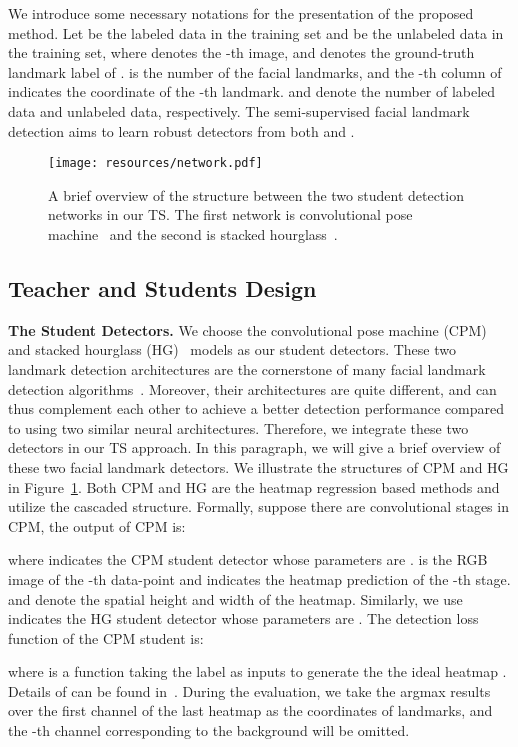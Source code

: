 \documentclass[10pt,twocolumn,letterpaper]{article}
\def\Figref#1{Figure~\ref{#1}}
\begin{document}
We introduce some necessary notations for the presentation of the proposed method.
Let  be the labeled data in the training set and  be the unlabeled data in the training set, where  denotes the -th image, and  denotes the ground-truth landmark label of .
 is the number of the facial landmarks, and the -th column of  indicates the coordinate of the -th landmark. 
 and  denote the number of labeled data and unlabeled data, respectively.
The semi-supervised facial landmark detection aims to learn robust detectors from both  and .




\begin{figure}[t]
\center
\texttt{[image: resources/network.pdf]}
\caption{
A brief overview of the structure between the two student detection networks in our TS. The first network is convolutional pose machine~\cite{wei2016convolutional} and the second is stacked hourglass~\cite{newell2016stacked}.
}
\label{fig:network}
\end{figure}



\subsection{Teacher and Students Design}\label{sec:teacher-student}

\textbf{The Student Detectors.}
We choose the convolutional pose machine (CPM)~\cite{wei2016convolutional} and stacked hourglass (HG)~\cite{newell2016stacked} models as our student detectors.
These two landmark detection architectures are the cornerstone of many facial landmark detection algorithms~\cite{newell2016stacked,dong2018san,bulat2017far,tang2018quantized}.
Moreover, their architectures are quite different, and can thus complement each other to achieve a better detection performance compared to using two similar neural architectures.
Therefore, we integrate these two detectors in our TS approach.
In this paragraph, we will give a brief overview of these two facial landmark detectors.
We illustrate the structures of CPM and HG in \Figref{fig:network}. Both CPM and HG are the heatmap regression based methods and utilize the cascaded structure.
Formally, suppose there are  convolutional stages in CPM, the output of CPM is:
{

}
\noindent where  indicates the CPM student detector whose parameters are .  is the RGB image of the -th data-point and  indicates the heatmap prediction of the -th stage.  and  denote the spatial height and width of the heatmap.
Similarly, we use  indicates the HG student detector whose parameters are .
The detection loss function of the CPM student is:
{

}\noindent where  is a function taking the label  as inputs to generate the the ideal heatmap .
Details of  can be found in~\cite{wei2016convolutional,newell2016stacked}. During the evaluation, we take the argmax results over the first  channel of the last heatmap  as the coordinates of landmarks, and the -th channel corresponding to the background will be omitted.
\end{document}

